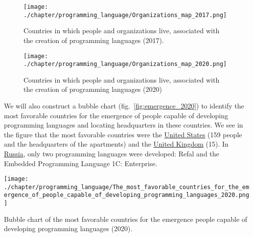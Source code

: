 \begin{figure}[h]
\centering
	\texttt{[image: ./chapter/programming\_language/Organizations\_map\_2017.png]}
	\caption{Countries in which people and organizations live, associated with the creation of programming languages (2017).}
	\label{fig:organizations_2017}
\end{figure}

\begin{figure}[h]
\centering
	\texttt{[image: ./chapter/programming\_language/Organizations\_map\_2020.png]}
	\caption{Countries in which people and organizations live, associated with the creation of programming languages (2020)}
	\label{fig:organizations_2020}
\end{figure}

We will also construct a bubble chart (fig.~\ref{fig:emergence_2020}) to identify the most favorable countries for the emergence of people capable of developing programming languages and locating headquarters in these countries. We see in the figure that the most favorable countries were the \href{https://en.wikipedia.org/wiki/United_States}{United States} (159 people and the headquarters of the apartments) and the \href{https://en.wikipedia.org/wiki/United_Kingdom}{United Kingdom} (15). In \href{https://en.wikipedia.org/wiki/Russia}{Russia}, only two programming languages were developed: Refal and the Embedded Programming Language 1C: Enterprise.

\begin{marginfigure}[7cm]
	\texttt{[image: ./chapter/programming\_language/The\_most\_favorable\_countries\_for\_the\_emergence\_of\_people\_capable\_of\_developing\_programming\_languages\_2020.png]}
	\caption{Bubble chart of the most favorable countries for the emergence people capable of developing programming languages (2020).}
	\label{fig:emergence_2020}
\end{marginfigure}

